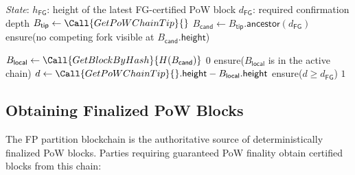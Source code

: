\begin{algorithm}[!htbp]
  \caption{Finality Gadget Round -- Leader}\label{alg:fg-leader}
  \begin{algorithmic}[0]
    \State \emph{State}:
    \State $h_\mathsf{FG}$: height of the latest FG-certified PoW block
    \State $d_\mathsf{FG}$: required confirmation depth
    \State
      \State $B_\mathsf{tip} \gets \Call{GetPoWChainTip}{}$  
      \State $B_\mathsf{cand} \gets B_\mathsf{tip}.\mathsf{ancestor}(d_\mathsf{FG})$
        \State \Return  {}
      \EndIf
      \State ensure(no competing fork visible at $B_\mathsf{cand}.\mathsf{height}$)
      \State
      \State {}
      \State {}
    \EndFunction
  \end{algorithmic}
\end{algorithm}

\begin{algorithm}[!htbp]
  \caption{Finality Gadget Round -- Follower Verification}\label{alg:fg-follower}
  \begin{algorithmic}[0]
      \State {}
      \State $B_\mathsf{local} \gets \Call{GetBlockByHash}{H(B_\mathsf{cand})}$
        \State \Return $0$  
      \EndIf
      \State ensure($B_\mathsf{local}$ is in the active chain) 
      \State $d \gets \Call{GetPoWChainTip}{}.\mathsf{height} - B_\mathsf{local}.\mathsf{height}$
      \State ensure($d \ge d_\mathsf{FG}$) 
      \State \Return $1$  
    \EndFunction
  \end{algorithmic}
\end{algorithm}


\subsection{Obtaining Finalized PoW Blocks}\label{sec:fg-obtaining}

The FP partition blockchain is the authoritative source of deterministically finalized PoW blocks. Parties requiring guaranteed PoW finality obtain certified blocks from this chain:

